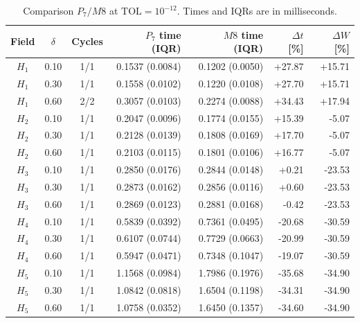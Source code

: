 \documentclass[11pt]{article}
\begin{document}
\begin{table}[htbp]\centering\small
\caption{Comparison $P_7/M8$ at $\mathrm{TOL}=10^{-12}$. Times and IQRs are in milliseconds.}\label{tab:p7}
\setlength{\tabcolsep}{4pt}
\begin{tabular}{cccrrrr}\toprule
Field & $\delta$ & Cycles & $P_7$ time (IQR) & $M8$ time (IQR) & $\Delta t$ [\%] & $\Delta W$ [\%]\\\midrule
$H_1$ & 0.10 & 1/1 & 0.1537 (0.0084) & 0.1202 (0.0050) & +27.87 & +15.71\\
$H_1$ & 0.30 & 1/1 & 0.1558 (0.0102) & 0.1220 (0.0108) & +27.70 & +15.71\\
$H_1$ & 0.60 & 2/2 & 0.3057 (0.0103) & 0.2274 (0.0088) & +34.43 & +17.94\\
$H_2$ & 0.10 & 1/1 & 0.2047 (0.0096) & 0.1774 (0.0155) & +15.39 & -5.07\\
$H_2$ & 0.30 & 1/1 & 0.2128 (0.0139) & 0.1808 (0.0169) & +17.70 & -5.07\\
$H_2$ & 0.60 & 1/1 & 0.2103 (0.0115) & 0.1801 (0.0106) & +16.77 & -5.07\\
$H_3$ & 0.10 & 1/1 & 0.2850 (0.0176) & 0.2844 (0.0148) & +0.21 & -23.53\\
$H_3$ & 0.30 & 1/1 & 0.2873 (0.0162) & 0.2856 (0.0116) & +0.60 & -23.53\\
$H_3$ & 0.60 & 1/1 & 0.2869 (0.0123) & 0.2881 (0.0168) & -0.42 & -23.53\\
$H_4$ & 0.10 & 1/1 & 0.5839 (0.0392) & 0.7361 (0.0495) & -20.68 & -30.59\\
$H_4$ & 0.30 & 1/1 & 0.6107 (0.0744) & 0.7729 (0.0663) & -20.99 & -30.59\\
$H_4$ & 0.60 & 1/1 & 0.5947 (0.0471) & 0.7348 (0.1047) & -19.07 & -30.59\\
$H_5$ & 0.10 & 1/1 & 1.1568 (0.0984) & 1.7986 (0.1976) & -35.68 & -34.90\\
$H_5$ & 0.30 & 1/1 & 1.0842 (0.0818) & 1.6504 (0.1198) & -34.31 & -34.90\\
$H_5$ & 0.60 & 1/1 & 1.0758 (0.0352) & 1.6450 (0.1357) & -34.60 & -34.90\\
\bottomrule
\end{tabular}
\end{table}
\end{document}
